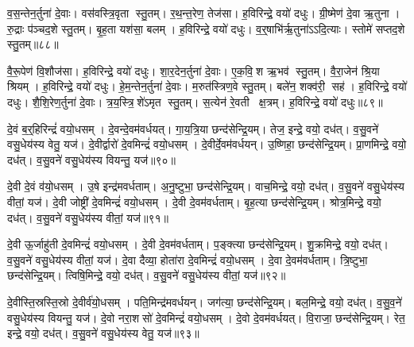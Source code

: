 व॒स॒न्तेन॒र्तुना॑ दे॒वाः।
वस॑वस्त्रि॒वृता स्तु॒तम्।
र॒थ॒न्त॒रेण॒ तेज॑सा।
ह॒विरिन्द्रे॒ वयो॑ दधुः।
ग्री॒ष्मेण॑ दे॒वा ऋ॒तुना।
रु॒द्राः प॑ञ्चद॒शे स्तु॒तम्।
बृ॒ह॒ता यश॑सा॒ बलम्।
ह॒विरिन्द्रे॒ वयो॑ दधुः।
व॒र्॒षाभि॑र्\mbox{}ऋ॒तुना॑ऽऽदि॒त्याः।
स्तोमे॑ सप्तद॒शे स्तु॒तम्॥८८॥

वै॒रू॒पेण॑ वि॒शौज॑सा।
ह॒विरिन्द्रे॒ वयो॑ दधुः।
शा॒र॒देन॒र्तुना॑ दे॒वाः।
ए॒क॒वि॒श ऋ॒भव॑ स्तु॒तम्।
वै॒रा॒जेन॑ श्रि॒या श्रियम्।
ह॒विरिन्द्रे॒ वयो॑ दधुः।
हे॒म॒न्तेन॒र्तुना॑ दे॒वाः।
म॒रुत॑स्त्रिण॒वे स्तु॒तम्।
बले॑न॒ शक्व॑री॒ सह॑।
ह॒विरिन्द्रे॒ वयो॑ दधुः।
शै॒शि॒रेण॒र्तुना॑ दे॒वाः।
त्र॒य॒स्त्रि॒शे॑ऽमृत स्तु॒तम्।
स॒त्येन॑ रे॒वती क्ष॒त्रम्।
ह॒विरिन्द्रे॒ वयो॑ दधुः॥८९॥\anuvakamend[स्तोमे॑ सप्तद॒शे स्तु॒त सहो॑ ह॒विरिन्द्रे॒ वयो॑ दधुश्च॒त्वारि॑ च (व॒स॒न्तेन॑ ग्री॒ष्मेण॑ व॒र्‌षाभि॑ शार॒देन॑ हेम॒न्तेन॑ शैशि॒रेण॒ षट् ॥ )]

दे॒वं ब॒र्॒हिरिन्द्रं॑ वयो॒धसम्।
दे॒वन्दे॒वम॑वर्धयत्।
गा॒य॒त्रि॒या छन्द॑सेन्द्रि॒यम्।
तेज॒ इन्द्रे॒ वयो॒ दध॑त्।
व॒सु॒वने॑ वसु॒धेय॑स्य वेतु॒ यज॑।
दे॒वीर्द्वारो॑ दे॒वमिन्द्रं॑ वयो॒धसम्।
दे॒वीर्दे॒वम॑वर्धयन्।
उ॒ष्णिहा॒ छन्द॑सेन्द्रि॒यम्।
प्रा॒णमिन्द्रे॒ वयो॒ दध॑त्।
व॒सु॒वने॑ वसु॒धेय॑स्य वियन्तु॒ यज॑॥९०॥

दे॒वी दे॒वं व॑यो॒धसम्।
उ॒षे इन्द्र॑मवर्धताम्।
अ॒नु॒ष्टुभा॒ छन्द॑सेन्द्रि॒यम्।
वाच॒मिन्द्रे॒ वयो॒ दध॑त्।
व॒सु॒वने॑ वसु॒धेय॑स्य वीतां॒ यज॑।
दे॒वी जोष्ट्री॑ दे॒वमिन्द्रं॑ वयो॒धसम्।
दे॒वी दे॒वम॑वर्धताम्।
बृ॒ह॒त्या छन्द॑सेन्द्रि॒यम्।
श्रोत्र॒मिन्द्रे॒ वयो॒ दध॑त्।
व॒सु॒वने॑ वसु॒धेय॑स्य वीतां॒ यज॑॥९१॥

दे॒वी ऊ॒र्जाहु॑ती दे॒वमिन्द्रं॑ वयो॒धसम्।
दे॒वी दे॒वम॑वर्धताम्।
प॒ङ्क्त्या छन्द॑सेन्द्रि॒यम्।
शु॒क्रमिन्द्रे॒ वयो॒ दध॑त्।
व॒सु॒वने॑ वसु॒धेय॑स्य वीतां॒ यज॑।
दे॒वा दैव्या॒ होता॑रा दे॒वमिन्द्रं॑ वयो॒धसम्।
दे॒वा दे॒वम॑वर्धताम्।
त्रि॒ष्टुभा॒ छन्द॑सेन्द्रि॒यम्।
त्विषि॒मिन्द्रे॒ वयो॒ दध॑त्।
व॒सु॒वने॑ वसु॒धेय॑स्य वीतां॒ यज॑॥९२॥

दे॒वीस्ति॒स्रस्ति॒स्रो दे॒वीर्व॑यो॒धसम्।
पति॒मिन्द्र॑मवर्धयन्।
जग॑त्या॒ छन्द॑सेन्द्रि॒यम्।
बल॒मिन्द्रे॒ वयो॒ दध॑त्।
व॒सु॒व॒ने॑ वसु॒धेय॑स्य वियन्तु॒ यज॑।
दे॒वो नरा॒शसो॑ दे॒वमिन्द्रं॑ वयो॒धसम्।
दे॒वो दे॒वम॑वर्धयत्।
वि॒राजा॒ छन्द॑सेन्द्रि॒यम्।
रेत॒ इन्द्रे॒ वयो॒ दध॑त्।
व॒सु॒वने॑ वसु॒धेय॑स्य वेतु॒ यज॑॥९३॥

